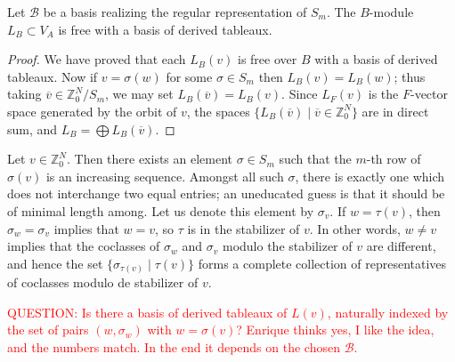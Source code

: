 \documentclass[11pt,fleqn]{article}
\newcommand\ZZ{\mathbb Z}
\newcommand\B{\mathcal B}
\begin{document}
\begin{Proposition}
\label{derived-tableaux-basis}
Let $\B$ be a basis realizing the regular representation of $S_m$.
The $B$-module $L_B \subset V_A$ is free with a basis of derived tableaux.
\end{Proposition}
\begin{proof}
We have proved that each $L_B(v)$ is free over $B$ with a basis of derived 
tableaux. Now if $v = \sigma(w)$ for some $\sigma \in S_m$ then $L_B(v) = 
L_B(w)$; thus taking $\overline v \in \ZZ^N_0 / S_m$, we may set 
$L_B(\overline v) = L_B(v)$. Since $L_F(v)$ is the $F$-vector space generated 
by the orbit of $v$, the spaces $\{L_B(\overline v) \mid \overline v \in 
\ZZ^N_0\}$ are in direct sum, and $L_B = \bigoplus L_B(\overline v)$. 
\end{proof}

Let $v \in \ZZ^N_0$. Then there exists an element $\sigma \in S_m$ such that
the $m$-th row of $\sigma(v)$ is an increasing sequence. Amongst all such 
$\sigma$, there is exactly one which does not interchange two equal entries; 
an uneducated guess is that it should be of minimal length among.
Let us denote this element by $\sigma_v$. If $w = \tau(v)$, then $\sigma_w = 
\sigma_v$ implies that $w = v$, so $\tau$ is in the stabilizer of $v$. In other
words, $w \neq v$ implies that the coclasses of $\sigma_w$ and $\sigma_v$
modulo the stabilizer of $v$ are different, and hence the set 
$\{\sigma_{\tau(v)} \mid \tau (v)\}$ forms a complete collection of 
representatives of coclasses modulo de stabilizer of $v$. 

\textcolor{red}{QUESTION: Is there a basis of derived tableaux of $L(v)$, 
naturally indexed by the set of pairs $(w,\sigma_w)$ with $w = \sigma(v)$?
Enrique thinks yes, I like the idea, and the numbers match. In the end it
depends on the chosen $\B$.}
\end{document}
